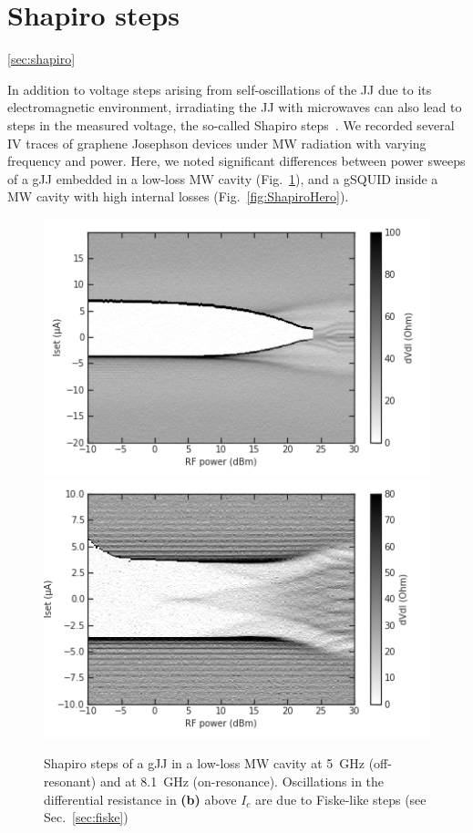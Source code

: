 \section{Shapiro steps}\ref{sec:shapiro}

In addition to voltage steps arising from self-oscillations of the JJ due to its electromagnetic environment, irradiating the JJ with microwaves can also lead to steps in the measured voltage, the so-called Shapiro steps~\cite{shapiroJosephsonCurrentsSuperconducting1963,kautzNoiseChaosJosephson1996,tinkhamIntroductionSuperconductivity1996,heerscheBipolarSupercurrentGraphene2007a,leeUltimatelyShortBallistic2015,shellyExistenceShapiroSteps2020,larsonZerobiasCrossingsPeculiar2020}.
%
We recorded several IV traces of graphene Josephson devices under MW radiation with varying frequency and power.
%
Here, we noted significant differences between power sweeps of a gJJ embedded in a low-loss MW cavity (Fig.~\ref{fig:Shapiro2x1}), and a gSQUID inside a MW cavity with high internal losses (Fig.~\ref{fig:ShapiroHero}).

\begin{figure}
	\centering
	\includegraphics[width=0.45\linewidth]{chapter-gJJ-misc/figs/processing_Shapiro_2x1_5GHz}
	\hfill
	\includegraphics[width=0.45\linewidth]{chapter-gJJ-misc/figs/processing_Shapiro_2x1_onres}
	\caption{
		Shapiro steps of a gJJ in a low-loss MW cavity at \SI{5}{\giga\hertz} (off-resonant) and at \SI{8.1}{\giga\hertz} (on-resonance).
		Oscillations in the differential resistance in \textbf{(b)} above $I_c$ are due to Fiske-like steps (see Sec.~\ref{sec:fiske})
	}
	\label{fig:Shapiro2x1}
\end{figure}

